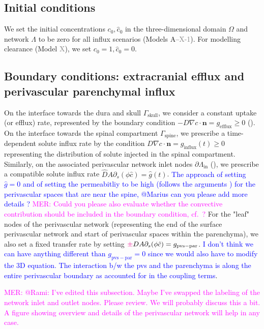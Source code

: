 \documentclass[fleqn,10pt]{wlscirep}
\newcommand{\rami}[1]{\textcolor{blue}{#1}}
\newcommand{\mer}[1]{\textcolor{magenta}{#1}}
\newcommand{\draft}[1]{\textcolor{gray}{#1}}
\begin{document}
\subsection*{Initial conditions}

We set the initial concentrations $c_0, \hat{c}_0$ in the three-dimensional domain $\Omega$ and network $\Lambda$ to be zero for all influx scenarios (Models A--\draft{X-1}). For modelling clearance (Model \draft{X}), we set $c_0 = 1, \hat{c}_0 = 0$.

\subsection*{Boundary conditions: extracranial efflux and perivascular parenchymal influx}

On the interface towards the dura and skull $\Gamma_{\mathrm{skull}}$, we consider a constant uptake (or efflux) rate, represented by the boundary condition $- D \nabla c \cdot \bm{n} = g_{\mathrm{efflux}} \geq 0$ (). On the interface towards the spinal compartment $\Gamma_{\mathrm{spine}}$, we prescribe a time-dependent solute influx rate by the condition $D \nabla c \cdot \bm{n} = g_{\mathrm{influx}}(t) \geq 0$ representing the distribution of solute injected in the spinal compartment. Similarly, on the associated perivascular network inlet nodes $\partial \Lambda_{\mathrm{in}}$ (), we prescribe a compatible solute influx rate $\hat D A \partial_s (\phi \hat c) = \hat g(t)$. \rami{The approach of setting $\hat g = 0$ and of setting the permeabitliy to be high (follows the arguments \cite{eide2024functional}) for the perivascular spaces that are near the spine, @Marius can you please add more details ? } \mer{MER: Could you please also evaluate whether the convective contribution should be included in the boundary condition, cf.~\cite{hornkjol2022csf}?} For the "leaf" nodes of the perivascular network (representing the end of the surface perivascular network and start of perivascular spaces within the parenchyma), we also set a fixed transfer rate by setting $\mer{\pm} D A \partial_s (\phi \hat c) = g_{\mathrm{pvs-par}}$. \rami{I don't think we can have anything different than $g_{\mathrm{pvs-par}} = 0$ since we would also have to modify the 3D equation. The interaction b/w the pvs and the parenchyma is along the entire perivascular boundary as accounted for in the coupling terms}. 

\noindent \mer{MER: @Rami: I've edited this subsection. Maybe I've swapped the labeling of the network inlet and outlet nodes. Please review. We will probably discuss this a bit. A figure showing overview and details of the perivascular network will help in any case.}
\end{document}
